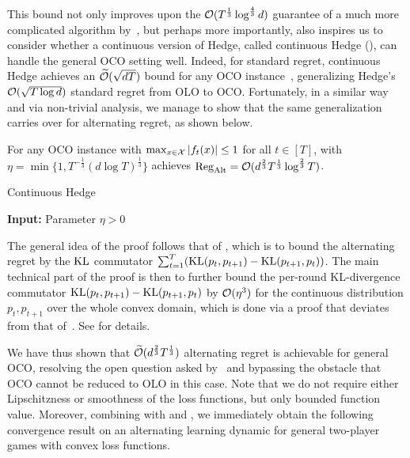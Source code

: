 This bound not only improves upon the $\mathcal{O}(T^{\frac{1}{3}}\log^{\frac{4}{3}}d)$ guarantee of a much more complicated algorithm by~\citet{cevher2024alternation}, 
but perhaps more importantly, also inspires us to consider 
whether a continuous version of Hedge, called continuous Hedge (), can handle the general OCO setting well.
Indeed, for standard regret, continuous Hedge achieves an $\widetilde{\mathcal{O}}(\sqrt{dT})$ bound for any OCO instance~\citep{narayanan2010random}, generalizing Hedge's $\mathcal{O}(\sqrt{T\log d})$ standard regret from OLO to OCO.
Fortunately, in a similar way and via non-trivial analysis, we manage to show that the same generalization carries over for alternating regret, as shown below.

\begin{theorem}\label{thm:hedge-cont}
    For any OCO instance with  $\max_{x\in{\mathcal{X}}}|f_t(x)|\le 1$ for all $t\in[T]$,  with $\eta = \min\{1,T^{-\frac{1}{3}}(d\log T)^{\frac{1}{3}}\}$ achieves $\mathrm{Reg}_{\mathrm{Alt}}=\mathcal{O}(d^{\frac{2}{3}}T^{\frac{1}{3}}\log^{\frac{2}{3}}T)$.
\end{theorem}


\begin{algorithm}[t]
   \caption{Continuous Hedge}
   \label{alg:hedge-cont}
   {\bfseries Input:} Parameter $\eta>0$
   
\end{algorithm}
The general idea of the proof follows that of , which is to bound the alternating regret by the $\text{\rm KL}$ commutator $\sum_{t=1}^T(\text{\rm KL}(p_t,p_{t+1})-\text{\rm KL}(p_{t+1},p_{t}))$. The main technical part of the proof is then to further bound the per-round KL-divergence commutator $\text{\rm KL}(p_t,p_{t+1})-\text{\rm KL}(p_{t+1},p_t)$ by $\mathcal{O}(\eta^3)$ for the continuous distribution $p_t, p_{t+1}$ over the whole convex domain, which is done via a proof that deviates from that of~\citet[Lemma~A.2]{wibisono2022alternating}.
See  for details.

We have thus shown that $\widetilde{\mathcal{O}}(d^{\frac{2}{3}}T^{\frac{1}{3}})$ alternating regret is achievable for general OCO, resolving the open question asked by~\citet{cevher2024alternation}
and bypassing the obstacle that OCO cannot be reduced to OLO in this case.
Note that we do not require either Lipschitzness or smoothness of the loss functions, but only bounded function value. 
Moreover, combining  with  and , we immediately obtain the following convergence result on an alternating learning dynamic for general two-player games with convex loss functions.

